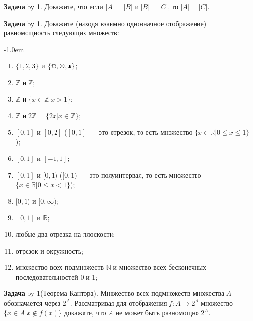 \documentclass[a4paper,10pt]{article}
\def\problem{\textbf{Задача \the\problemnum}\advance\problemnum by 1}
\begin{document}
\problem. Докажите, что если $|A|=|B|$ и $|B|=|C|$, то $|A|=|C|$.

\problem. Докажите (находя взаимно однозначное отображение) равномощность следующих множеств: \par\kern-1.0em
\begin{multicols}{2}
	\begin{enumerate}[label=(\arabic*)\,]
		\item $\{1,2,3\}$ и $\{\sun,\smiley,\bell\}$;
		\item $\mathbb Z$ и $\mathbb Z$;
		\item $\mathbb Z$ и $\{x\in\mathbb Z|x>1\}$;
		\item $\mathbb Z$ и $2\mathbb Z=\{2x|x\in\mathbb Z\}$;
		\item $[0,1]$ и $[0,2]$ ($[0,1]$~--- это отрезок, то есть множество $\{x\in \mathbb R|0\leqslant x\leqslant 1\}$);
		\item $[0,1]$ и $[-1,1]$;
		\item $[0,1]$ и $[0,1)$ ($[0,1)$~--- это полуинтервал, то есть множество $\{x\in \mathbb R|0\leqslant x<1\}$);
		\item $[0,1)$ и $[0,\infty)$;
		\item $[0,1]$ и $\mathbb R$;
		\item любые два отрезка на плоскости;
		\item отрезок и окружность;
		\item множество всех подмножеств $\mathbb N$ и множество всех бесконечных последовательностей 0 и 1;
	\end{enumerate}
\end{multicols}

\problem (Теорема Кантора). Множество всех подмножеств множества $A$ обозначается через $2^A$. Рассматривая для отображения $f:A\to 2^A$ множество $\{x\in A|x\not\in f(x)\}$ докажите, что $A$ не может быть равномощно $2^A$.
\end{document}
